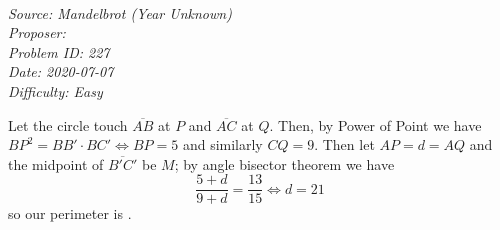 \SSbreak\\
\emph{Source: Mandelbrot (Year Unknown)}\\
\emph{Proposer: \Ppi}\\
\emph{Problem ID: 227}\\
\emph{Date: 2020-07-07}\\
\emph{Difficulty: Easy}\\
\SSbreak

\bigskip

\begin{solution}\hfil\medskip
  
  Let the circle touch $\overline{AB}$ at $P$ and $\overline{AC}$ at $Q$. Then, by Power of Point 
  we have $BP^2 = BB' \cdot BC' \iff BP = 5$ and similarly $CQ = 9$. Then let $AP = d = AQ$ and the 
  midpoint of $\overline{B'C'}$ be $M$; by angle bisector theorem we have 
  $$\dfrac{5 + d}{9 + d} = \dfrac{13}{15} \iff d = 21$$
  so our perimeter is .
\end{solution}\bigskip
